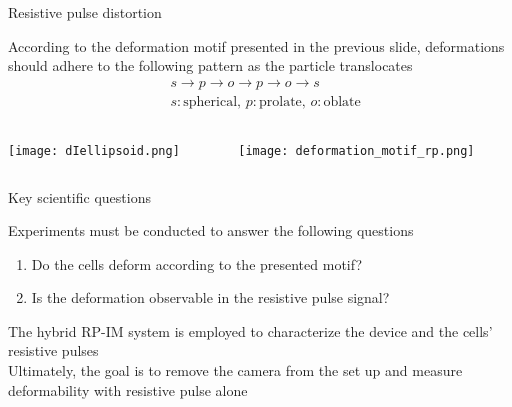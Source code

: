 \begin{frame}[c]{Resistive pulse distortion}

		According to the deformation motif presented in the previous slide, deformations should adhere to the following pattern as the particle translocates \\
		
		\begin{equation*}
			\begin{split}
				&s\rightarrow p\rightarrow o\rightarrow p\rightarrow o\rightarrow s \\
				&s: \mathrm{spherical},\,p: \mathrm{prolate},\,o:\mathrm{oblate}
			\end{split}
		\end{equation*}
		

	
	
	\begin{columns}[t]
		\begin{column}[T]{2in}
			{\centering
				\texttt{[image: dIellipsoid.png]} \\
				\par
			}
		\end{column}
		
		
		\begin{column}[T]{2.5in}
			{\centering
				\texttt{[image: deformation\_motif\_rp.png]} \\
				\par
			}
		\end{column}
	\end{columns}
			

\end{frame}




\begin{frame}[c]{Key scientific questions}
	  
	Experiments must be conducted to answer the following questions
	\begin{enumerate}
		\item Do the cells deform according to the presented motif?
		\item Is the deformation observable in the resistive pulse signal?
	\end{enumerate}

	The hybrid RP-IM system is employed to characterize the device and the cells' resistive pulses \\
	\vspace{0.1in}
	Ultimately, the goal is to remove the camera from the set up and measure deformability with resistive pulse alone \\
	

	
\end{frame}



